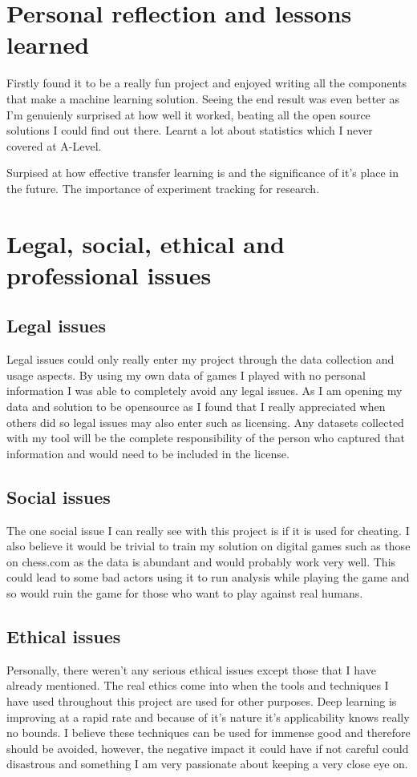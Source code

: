 \begin{appendices}
\section{Personal reflection and lessons learned}
Firstly found it to be a really fun project and enjoyed writing all the components that make a machine learning solution.  Seeing the end result was even better as 
I'm genuienly surprised at how well it worked, beating all the open source solutions I could find out there.  Learnt a lot about statistics which I never covered at A-Level.

Surpised at how effective transfer learning is and the significance of it's place in the future.
The importance of experiment tracking for research.

\section{Legal, social, ethical and professional issues}

\subsection{Legal issues}
Legal issues could only really enter my project through the data collection and usage aspects.  By using my own data of games I played with no personal information 
I was able to completely avoid any legal issues.  As I am opening my data and solution to be opensource as I found that I really appreciated when others did so legal 
issues may also enter such as licensing.  Any datasets collected with my tool will be the complete responsibility of the person who captured that information and would 
need to be included in the license.

\subsection{Social issues}
The one social issue I can really see with this project is if it is used for cheating.  I also believe it would be trivial to train my solution on digital games such 
as those on chess.com as the data is abundant and would probably work very well.  This could lead to some bad actors using it to run analysis while playing the game 
and so would ruin the game for those who want to play against real humans.

\subsection{Ethical issues}
Personally, there weren't any serious ethical issues except those that I have already mentioned.  The real ethics come into when the tools and techniques I have used 
throughout this project are used for other purposes.  Deep learning is improving at a rapid rate and because of it's nature it's applicability knows really no bounds.
I believe these techniques can be used for immense good and therefore should be avoided, however, the negative impact it could have if not careful could disastrous and 
something I am very passionate about keeping a very close eye on.


\end{appendices}
